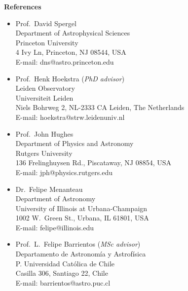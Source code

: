 \documentclass[11pt]{article}
\begin{document}
\noindent
{\bf\Large References}
\begin{itemize}
 \item Prof.~David Spergel\\
       Department of Astrophysical Sciences\\
       Princeton University\\
       4 Ivy Ln, Princeton, NJ 08544, USA\\
       E-mail: dns@astro.princeton.edu
 \item Prof.~Henk Hoekstra (\textit{PhD advisor})\\
       Leiden Observatory\\
       Universiteit Leiden\\
       Niels Bohrweg 2, NL-2333 CA Leiden, The Netherlands\\
       E-mail: hoekstra@strw.leidenuniv.nl
 \item Prof.~John Hughes\\
       Department of Physics and Astronomy\\
       Rutgers University\\
       136 Frelinghuysen Rd., Piscataway, NJ 08854, USA\\
       E-mail: jph@physics.rutgers.edu
 \item Dr.~Felipe Menanteau\\
       Department of Astronomy\\
       University of Illinois at Urbana-Champaign\\
       1002 W.\ Green St., Urbana, IL 61801, USA\\
       E-mail: felipe@illinois.edu
 \item Prof.~L.~Felipe Barrientos (\textit{MSc advisor})\\
       Departamento de Astronom\'ia y Astrof\'isica\\
       P. Universidad Cat\'olica de Chile\\
       Casilla 306, Santiago 22, Chile\\
       E-mail: barrientos@astro.puc.cl
\end{itemize}




% 
\end{document}

